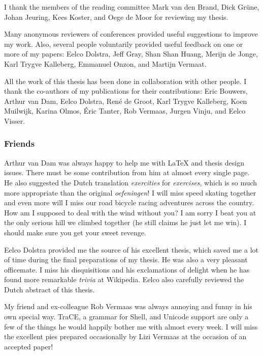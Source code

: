         I thank the members of the reading committee Mark van den
        Brand, Dick Gr\"une, Johan Jeuring, Kees Koster, and Oege de
        Moor for reviewing my thesis.

	Many anonymous reviewers of conferences provided useful
        suggestions to improve my work. Also, several people
        voluntarily provided useful feedback on one or more of my
        papers: Eelco Dolstra, Jeff Gray, Shan Shan Huang, Merijn de
        Jonge, Karl Trygve Kalleberg, Emmanuel Onzon, and Martijn
        Vermaat.

        All the work of this thesis has been done in collaboration
        with other people. I thank the co-authors of my publications
        for their contributions: Eric Bouwers, Arthur van Dam, Eelco
        Dolstra, Ren\'e de Groot, Karl Trygve Kalleberg, Koen
        Muilwijk, Karina Olmos, \'Eric Tanter, Rob Vermaas, Jurgen
        Vinju, and Eelco Visser.

\subsubsection*{Friends}

        Arthur van Dam was always happy to help me with \LaTeX{} and
        thesis design issues. There must be some contribution from him
        at almost every single page. He also suggested the Dutch
        translation \emph{exercities} for \emph{exercises}, which is
        so much more appropriate than the original \emph{oefeningen}!
        I will miss speed skating together and even more will I miss
        our road bicycle racing adventures across the country. How am
        I supposed to deal with the wind without you? I am sorry I
        beat you at the only serious hill we climbed together (he
        still claims he just let me win). I should make sure you get
        your sweet revenge.

        Eelco Dolstra provided me the source of his excellent thesis,
        which saved me a lot of time during the final preparations of
        my thesis. He was also a very pleasant officemate. I miss his
        disquisitions and his exclamations of delight when he has
        found more remarkable \emph{trivia} at Wikipedia. Eelco also
        carefully reviewed the Dutch abstract of this thesis.

        My friend and ex-colleague Rob Vermaas was always annoying and
        funny in his own special way. TraCE, a grammar for Shell, and
        Unicode support are only a few of the things he would happily
        bother me with almost every week. I will miss the excellent
        pies prepared occasionally by Lizi Vermaas at the occasion of
        an accepted paper!

